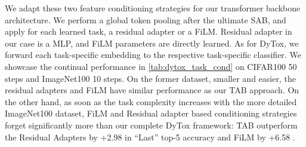 We adapt these two feature conditioning strategies for our transformer backbone architecture. We
perform a global token pooling after the ultimate SAB, and apply for each learned task, a residual
adapter or a FiLM. Residual adapter in our case is a MLP, and FiLM parameters are directly learned.
As for DyTox, we forward each task-specific embedding to the respective task-specific classifier. We
showcase the continual performance in \autoref{tab:dytox_task_cond} on CIFAR100 50 steps and
ImageNet100 10 steps. On the former dataset, smaller and easier,  the residual adapters and FiLM
have similar performance as our TAB approach. On the other hand, as soon as the task complexity
increases with the more detailed ImageNet100 dataset, FiLM and Residual adapter based conditioning
strategies forget significantly more than our complete DyTox framework: TAB outperform the Residual
Adapters by +2.98 \pp in ``Last'' top-5 accuracy and FiLM by +6.58 \pp.

